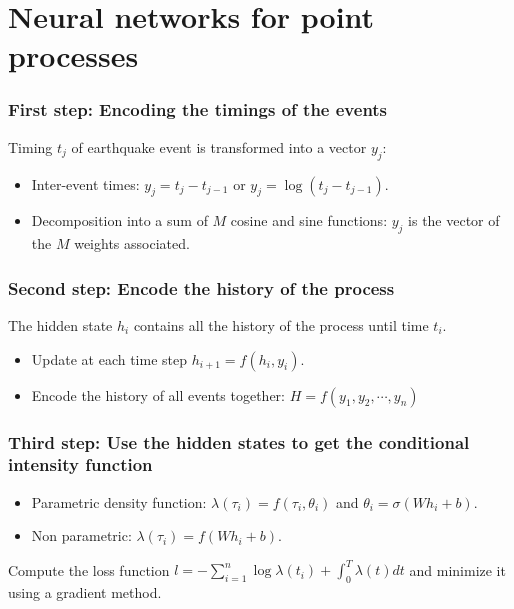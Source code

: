 \documentclass{beamer}
\begin{document}
	\section{Neural networks for point processes}

	\begin{frame}
		\frametitle{First step: Encoding the timings of the events}
		Timing $t_j$ of earthquake event is transformed into a vector $y_j$:

		\vspace{2em}

		\begin{itemize}
			\item Inter-event times: $y_j = t_j - t_{j - 1}$ or $y_j = \log \left( t_j - t_{j - 1} \right)$.

			\vspace{1em}

			\item Decomposition into a sum of $M$ cosine and sine functions: $y_j$ is the vector of the $M$ weights associated.
		\end{itemize}
	\end{frame}

	\begin{frame}
		\frametitle{Second step: Encode the history of the process}
		The hidden state $h_i$ contains all the history of the process until time $t_i$.

		\vspace{2em}

		\begin{itemize}
			\item Update at each time step $h_{i + 1} = f \left( h_i , y_i \right)$.

			\vspace{1em}

			\item Encode the history of all events together: $H = f \left( y_1 , y_2 , \cdots , y_n \right)$
		\end{itemize}
	\end{frame}

	\begin{frame}
		\frametitle{Third step: Use the hidden states to get the conditional intensity function}

		\begin{itemize}
			\item Parametric density function: $\lambda \left( \tau_i \right) = f \left( \tau_i , \theta_i \right)$ and $\theta_i = \sigma \left( W h_i + b \right)$.

			\vspace{1em}

			\item Non parametric: $\lambda \left( \tau_i \right) = f \left( W h_i + b \right)$.
		\end{itemize}

		\vspace{2em}

		Compute the loss function $l = - \sum_{i = 1}^n \log \lambda \left( t_i \right) + \int_0^T \lambda \left( t \right) dt$ and minimize it using a gradient method.
	\end{frame}
		
\end{document}
